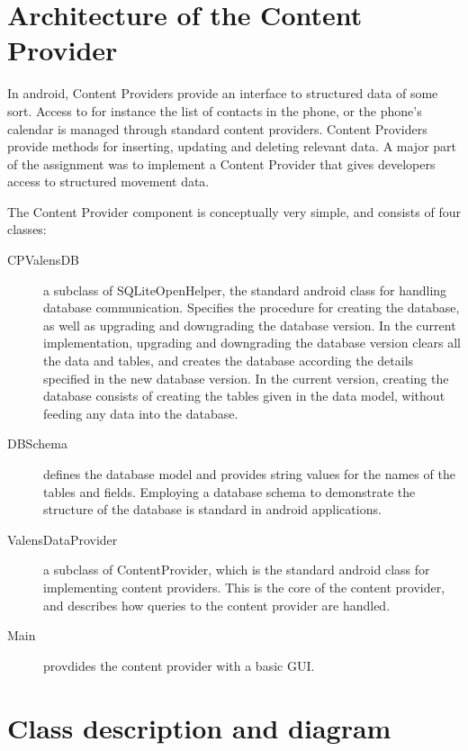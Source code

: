 \section{Architecture of the Content Provider}
In android, Content Providers provide an interface to structured data of some sort. Access to for instance the list of contacts in the phone, or the phone's calendar is managed through standard content providers. Content Providers provide methods for inserting, updating and deleting relevant data. A major part of the assignment was to implement a Content Provider that gives developers access to structured movement data.

The Content Provider component is conceptually very simple, and consists of four classes:
\begin{description}
\item[CPValensDB]
a subclass of SQLiteOpenHelper, the standard android class for handling database communication. Specifies the procedure for creating the database, as well as upgrading and downgrading the database version. In the current implementation, upgrading and downgrading the database version clears all the data and tables, and creates the database according the details specified in the new database version. In the current version, creating the database consists of creating the tables given in the data model, without feeding any data into the database.
\item[DBSchema]
defines the database model and provides string values for the names of the tables and fields. Employing a database schema to demonstrate the structure of the database is standard in android applications.
\item[ValensDataProvider]
a subclass of ContentProvider, which is the standard android class for implementing content providers. This is the core of the content provider, and describes how queries to the content provider are handled.
\item[Main]
provdides the content provider with a basic GUI.
\end{description}


\section{Class description and diagram}

